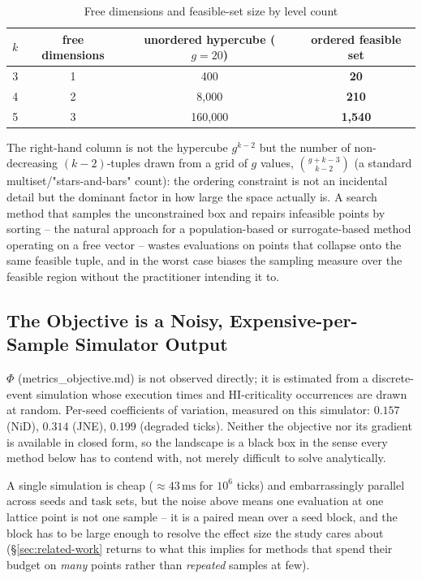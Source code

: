\documentclass{article}
\begin{document}
\begin{table}[h]
\centering
\caption{Free dimensions and feasible-set size by level count}
\begin{tabular}{cccc}
\toprule
$k$ & free dimensions & unordered hypercube ($g=20$) & ordered feasible set \\
\midrule
3 & 1 & 400 & \textbf{20} \\
4 & 2 & 8{,}000 & \textbf{210} \\
5 & 3 & 160{,}000 & \textbf{1{,}540} \\
\bottomrule
\end{tabular}
\end{table}

\noindent The right-hand column is not the hypercube $g^{k-2}$ but the number
of non-decreasing $(k{-}2)$-tuples drawn from a grid of $g$ values,
$\binom{g+k-3}{k-2}$ (a standard multiset/"stars-and-bars" count): the ordering
constraint is not an incidental detail but the dominant factor in how large
the space actually is. A search method that samples the unconstrained box and
repairs infeasible points by sorting -- the natural approach for a
population-based or surrogate-based method operating on a free vector --
wastes evaluations on points that collapse onto the same feasible tuple, and
in the worst case biases the sampling measure over the feasible region without
the practitioner intending it to.

\subsection{The Objective is a Noisy, Expensive-per-Sample Simulator Output}

$\Phi$ (metrics\_objective.md) is not observed directly; it is estimated from
a discrete-event simulation whose execution times and HI-criticality
occurrences are drawn at random. Per-seed coefficients of variation, measured
on this simulator: $0.157$ (NiD), $0.314$ (JNE), $0.199$ (degraded ticks).
Neither the objective nor its gradient is available in closed form, so the
landscape is a black box in the sense every method below has to contend with,
not merely difficult to solve analytically.

A single simulation is cheap ($\approx 43\,\mathrm{ms}$ for $10^6$ ticks) and
embarrassingly parallel across seeds and task sets, but the noise above means
one evaluation at one lattice point is not one sample -- it is a paired mean
over a seed block, and the block has to be large enough to resolve the effect
size the study cares about (\S\ref{sec:related-work} returns to what this
implies for methods that spend their budget on \emph{many} points rather than
\emph{repeated} samples at few).
\end{document}
